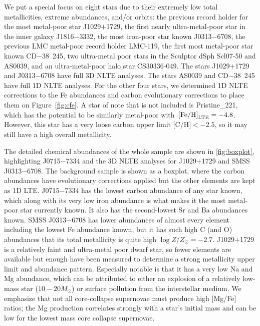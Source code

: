 \documentclass{natureprintstyle}
\newcommand{\unit}[1]{\ensuremath{\mathrm{\,#1}}\xspace}
\newcommand{\feh}{\unit{[Fe/H]}}
\newcommand{\logzzsun}{\ensuremath{\log Z/Z_\odot}\xspace}
\newcommand{\umpstar}{J0715$-$7334\xspace}
\newcommand{\cdstar}{CD$-$38~245\xspace}
\newcommand{\caffaustar}{J1029$+$1729\xspace}
\newcommand{\kellerstar}{SMSS J0313$-$6708\xspace}
\begin{document}
We put a special focus on eight stars due to their extremely low total metallicities, extreme abundances, and/or orbits:
the previous record holder for the most metal-poor star J1029$+$1729\cite{Caffau2011,Caffau2012,Lagae2023,Caffau2024}, the first nearly ultra-metal-poor star in the inner galaxy J1816$-$3332\cite{Howes2015}, the most iron-poor star known J0313$-$6708\cite{Keller2014,Nordlander2017}, the previous LMC metal-poor record holder LMC-119\cite{Chiti2024}, the first most metal-poor star known {\cdstar}\cite{Bessell1984,Cayrel2004,Mittal2025}, two ultra-metal poor stars in the Sculptor dSph Scl07-50\cite{Simon2015} and AS0039\cite{Skuladottir2021,Skuladottir2024}, and an ultra-metal-poor halo star CS30336-049\cite{Lai2008}.
The stars J1029$+$1729\cite{Lagae2023} and J0313$-$6708\cite{Nordlander2017} have full 3D NLTE analyses.
The stars AS0039\cite{Skuladottir2024} and \cdstar\cite{Mittal2025} have full 1D NLTE analyses.
For the other four stars, we determined 1D NLTE corrections to the Fe abundances\cite{Bergemann2012b} and carbon evolutionary corrections\cite{Placco2014} to place them on Figure~\ref{fig:cfe}.
A star of note that is not included is Pristine\_221\cite{Starkenburg2018}, which has the potential to be similarly metal-poor with $\feh_{\rm LTE} = -4.8$. However, this star has a very loose carbon upper limit $\mbox{[C/H]} < -2.5$\cite{Lardo2021}, so it may still have a high overall metallicity.

The detailed chemical abundances of the whole sample are shown in \ref{fig:boxplot}, highlighting \umpstar and the 3D NLTE analyses for \caffaustar and \kellerstar.
The background sample is shown as a boxplot, where the carbon abundances have evolutionary corrections applied\cite{Placco2014} but the other elements are kept as 1D LTE.
\umpstar has the lowest carbon abundance of any star known, which along with its very low iron abundance is what makes it the most metal-poor star currently known. It also has the second-lowest Sr and Ba abundances known.
\kellerstar has lower abundances of almost every element including the lowest Fe abundance known, but it has such high C (and O\cite{Bessell2015}) abundances that its total metallicity is quite high $\logzzsun = -2.7$.
\caffaustar is a relatively faint and ultra-metal poor dwarf star, so fewer elements are available but enough have been measured to determine a strong metallicity upper limit and abundance pattern\cite{Caffau2012,Lagae2023,Caffau2024}. Especially notable is that it has a very low Na and Mg abundance, which can be attributed to either an explosion of a relatively low-mass star ($10-20 M_\odot$)\cite{Lagae2023} or surface pollution from the interstellar medium\cite{Caffau2024}.
We emphasize that not all core-collapse supernovae must produce high [Mg/Fe] ratios; the Mg production correlates strongly with a star's initial mass and can be low for the lowest mass core collapse supernovae\cite{Jeena2024}.
\end{document}
